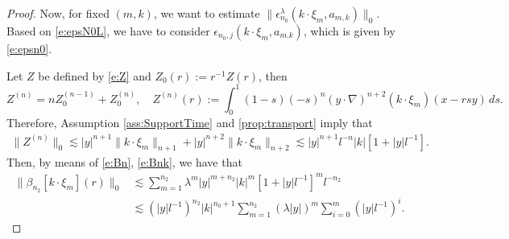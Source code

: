 \documentclass[10pt,a4paper]{amsart}
\numberwithin{equation}{section}
\numberwithin{corollario}{section}
\numberwithin{lemma}{section}
\numberwithin{prop}{section}
\theoremstyle{definition}
\theoremstyle{remark}
\begin{document}
\begin{proof}
 Now, for fixed $(m,k)$, we want to estimate $\|\epsilon_{n_0}^{\lambda}(k\cdot \xi_m,a_{m,k})\|_0$. Based on \eqref{e:epsN0L}, we have to consider $\epsilon_{n_0,j}(k\cdot \xi_m,a_{m.k})$, which is given by \eqref{e:epsn0}.

Let $Z$ be defined by \eqref{e:Z} and $Z_0(r):=r^{-1}Z(r)$, then
\begin{equation}\label{e_Zn}
    Z^{(n)}=nZ_0^{(n-1)}+Z_0^{(n)}, \quad Z^{(n)}(r):=\int_0^1(1-s)(-s)^n(y\cdot \nabla)^{n+2}(k\cdot \xi_m)(x-rsy)\,ds.
\end{equation}
Therefore,
Assumption \ref{ass:SupportTime} and \autoref{prop:transport} imply that
\begin{align}\label{est:Z}
    \|Z^{(n)}\|_0\lesssim |y|^{n+1}\|k\cdot \xi_m\|_{n+1}+|y|^{n+2}\|k\cdot \xi_m\|_{n+2}\lesssim |y|^{n+1}l^{-n}|k|[1+|y|l^{-1}].
\end{align}
Then, by means of \eqref{e:Bn}, \eqref{e:Bnk}, we have that
    \begin{align} \label{est:B}
        \|\beta_{n_2}[k\cdot \xi_m](r)\|_0&\lesssim\sum_{m=1}^{n_2}\lambda^m|y|^{m+n_2}|k|^m[1+|y|l^{-1}]^ml^{-n_2}\\
        &\lesssim(|y|l^{-1})^{n_2}|k|^{n_0+1}\sum_{m=1}^{n_2}(\lambda |y|)^m\sum_{i=0}^m(|y|l^{-1})^{i}.
    \end{align}


\end{proof}
\end{document}
